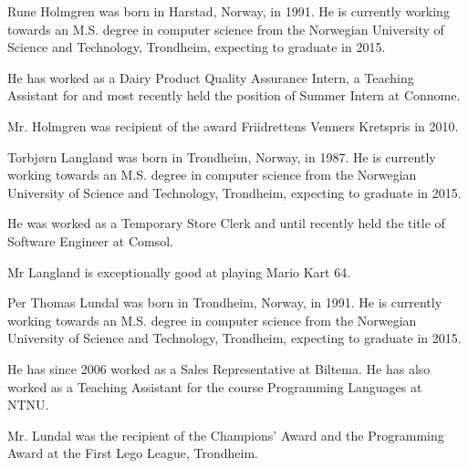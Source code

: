 \documentclass[a4paper]{IEEEtran}
\begin{document}
\begin{IEEEbiography}{Rune Holmgren}
    was born in Harstad, Norway, in 1991.
    He is currently working towards an M.S. degree in computer science from the Norwegian University of Science and Technology, Trondheim, expecting to graduate in 2015.

    He has worked as a Dairy Product Quality Assurance Intern, a Teaching Assistant for and most recently held the position of Summer Intern at Connome.

    Mr. Holmgren was recipient of the award Friidrettens Venners Kretspris in 2010.
\end{IEEEbiography}

\begin{IEEEbiography}{Torbjørn Langland}
    was born in Trondheim, Norway, in 1987.
    He is currently working towards an M.S. degree in computer science from the Norwegian University of Science and Technology, Trondheim, expecting to graduate in 2015.

    He was worked as a Temporary Store Clerk and until recently held the title of Software Engineer at Comsol.

    Mr Langland is exceptionally good at playing Mario Kart 64.
\end{IEEEbiography}

\begin{IEEEbiography}{Per Thomas Lundal}
    was born in Trondheim, Norway, in 1991.
    He is currently working towards an M.S. degree in computer science from the Norwegian University of Science and Technology, Trondheim, expecting to graduate in 2015.

    He has since 2006 worked as a Sales Representative at Biltema.
    He has also worked as a Teaching Assistant for the course Programming Languages at NTNU.

    Mr. Lundal was the recipient of the Champions' Award and the Programming Award at the First Lego League, Trondheim.
\end{IEEEbiography}
\end{document}
